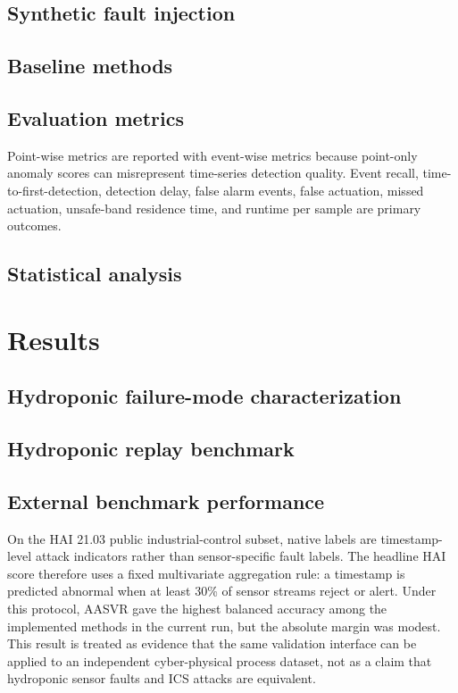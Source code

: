 \documentclass[preprint,12pt]{elsarticle}
\begin{document}
\subsection{Synthetic fault injection}
\subsection{Baseline methods}
\subsection{Evaluation metrics}
Point-wise metrics are reported with event-wise metrics because point-only anomaly scores can misrepresent time-series detection quality. Event recall, time-to-first-detection, detection delay, false alarm events, false actuation, missed actuation, unsafe-band residence time, and runtime per sample are primary outcomes.
\subsection{Statistical analysis}

\section{Results}
\subsection{Hydroponic failure-mode characterization}
\subsection{Hydroponic replay benchmark}
\subsection{External benchmark performance}
On the HAI 21.03 public industrial-control subset, native labels are timestamp-level attack indicators rather than sensor-specific fault labels. The headline HAI score therefore uses a fixed multivariate aggregation rule: a timestamp is predicted abnormal when at least 30\% of sensor streams reject or alert. Under this protocol, AASVR gave the highest balanced accuracy among the implemented methods in the current run, but the absolute margin was modest. This result is treated as evidence that the same validation interface can be applied to an independent cyber-physical process dataset, not as a claim that hydroponic sensor faults and ICS attacks are equivalent.
\end{document}
